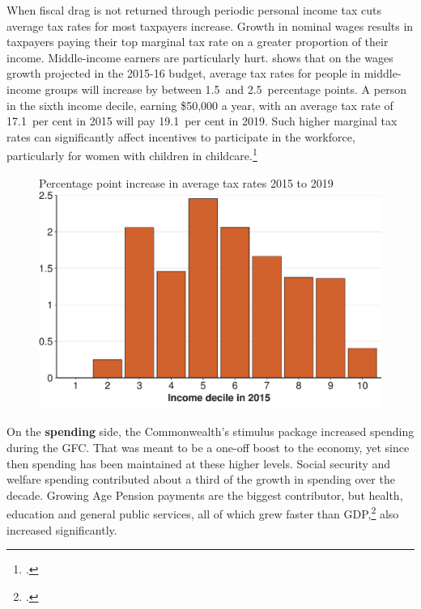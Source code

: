 \documentclass[twoside,english]{Dianab5ona4portrait}
\begin{document}
\enlargethispage*{0.5\baselineskip}
When fiscal drag is not returned through periodic personal income tax cuts average tax rates for most taxpayers increase. Growth in nominal wages results in taxpayers paying their top marginal tax rate on a greater proportion of their income. %
Middle-income earners are particularly hurt.  shows that on the wages growth projected in the 2015-16 budget, average tax rates for people in middle-income groups will increase by between 1.5~and 2.5~percentage points. A person in the sixth income decile, earning \$50,000 a year, with an average tax rate of 17.1~per cent in 2015 will pay 19.1~per cent in 2019. Such higher marginal tax rates can significantly affect incentives to participate in the workforce, particularly for women with children in childcare.\footcites[][11--12]{ProductivityCommission2015-Childcare}[][42--43]{DaleyMcGannonGinnivan2012}

\begin{figure}[hbp]
%
{Percentage point increase in average tax rates 2015 to 2019}
\includegraphics[width=\columnwidth]{Fiscal-challenges/figure/Figure4-1.pdf}
\end{figure}

On the \textbf{spending} side, the Commonwealth’s stimulus package increased spending during the GFC\@. That was meant to be a one-off boost to the economy, yet since then spending has been maintained at these higher levels. Social security and welfare spending contributed about a third of the growth in spending over the decade. Growing Age Pension payments are the biggest contributor, but health, education and general public services, all of which grew faster than GDP,\footcites[][7--8]{PBO2013}[][20--23]{DaleyWoodWeidmannEtAl2014}  also increased significantly.\enlargethispage*{1\baselineskip} 
\makeatletter\@openrightfalse
\end{document}
